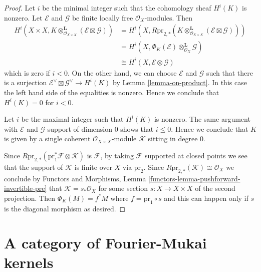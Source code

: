 \begin{proof}
Let $i$ be the minimal integer such that the cohomology sheaf $H^i(K)$ is
nonzero. Let $\mathcal{E}$ and $\mathcal{G}$ be finite locally free
$\mathcal{O}_X$-modules. Then
\begin{align*}
H^i(X \times X, K \otimes_{\mathcal{O}_{X \times X}}^\mathbf{L}
(\mathcal{E} \boxtimes \mathcal{G}))
& =
H^i(X, R\text{pr}_{2, *}(K \otimes_{\mathcal{O}_{X \times X}}^\mathbf{L}
(\mathcal{E} \boxtimes \mathcal{G}))) \\
& =
H^i(X, \Phi_K(\mathcal{E}) \otimes_{\mathcal{O}_X}^\mathbf{L} \mathcal{G}) \\
& \cong
H^i(X, \mathcal{E} \otimes \mathcal{G})
\end{align*}
which is zero if $i < 0$. On the other hand, we can choose
$\mathcal{E}$ and $\mathcal{G}$ such that there is a surjection
$\mathcal{E}^\vee \boxtimes \mathcal{G}^\vee \to H^i(K)$
by Lemma \ref{lemma-on-product}.
In this case the left hand side of the equalities is nonzero.
Hence we conclude that $H^i(K) = 0$ for $i < 0$.

\medskip\noindent
Let $i$ be the maximal integer such that $H^i(K)$ is nonzero.
The same argument with $\mathcal{E}$ and $\mathcal{G}$
support of dimension $0$ shows that $i \leq 0$.
Hence we conclude that $K$ is given by a single coherent
$\mathcal{O}_{X \times X}$-module $\mathcal{K}$ sitting in degree $0$.

\medskip\noindent
Since $R\text{pr}_{2, *}(\text{pr}_1^*\mathcal{F} \otimes \mathcal{K})$
is $\mathcal{F}$, by taking $\mathcal{F}$ supported at closed points
we see that the support of $\mathcal{K}$ is finite over $X$ via
$\text{pr}_2$. Since $R\text{pr}_{2, *}(\mathcal{K}) \cong \mathcal{O}_X$
we conclude by Functors and Morphisms, Lemma
\ref{functors-lemma-pushforward-invertible-pre}
that $\mathcal{K} = s_*\mathcal{O}_X$ for some section $s : X \to X \times X$
of the second projection. Then $\Phi_K(M) = f^*M$ where
$f = \text{pr}_1 \circ s$ and this can happen only if $s$
is the diagonal morphism as desired.
\end{proof}








\section{A category of Fourier-Mukai kernels}
\label{section-category-Fourier-Mukai-kernels}

